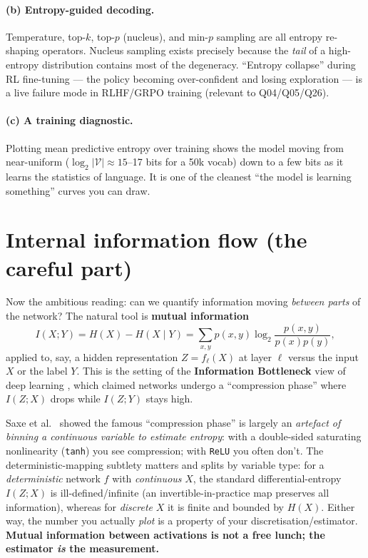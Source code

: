 \documentclass[11pt,letterpaper]{article}
\begin{document}
\paragraph{(b) Entropy-guided decoding.}
Temperature, top-$k$, top-$p$ (nucleus), and min-$p$ sampling are all entropy
re-shaping operators. Nucleus sampling \citep{holtzman2020nucleus} exists precisely
because the \emph{tail} of a high-entropy distribution contains most of the
degeneracy. ``Entropy collapse'' during RL fine-tuning --- the policy becoming
over-confident and losing exploration --- is a live failure mode in RLHF/GRPO
training (relevant to Q04/Q05/Q26).

\paragraph{(c) A training diagnostic.}
Plotting mean predictive entropy over training shows the model moving from
near-uniform ($\log_2|\mathcal V|\approx 15$--17 bits for a 50k vocab) down to a
few bits as it learns the statistics of language. It is one of the cleanest
``the model is learning something'' curves you can draw.

\section{Internal information flow (the careful part)}

Now the ambitious reading: can we quantify information moving \emph{between parts}
of the network? The natural tool is \textbf{mutual information}
\[
  I(X;Y) = H(X) - H(X\mid Y) = \sum_{x,y} p(x,y)\log_2\frac{p(x,y)}{p(x)p(y)},
\]
applied to, say, a hidden representation $Z=f_\ell(X)$ at layer $\ell$ versus the
input $X$ or the label $Y$. This is the setting of the \textbf{Information
Bottleneck} view of deep learning \citep{tishby2015ib,shwartzziv2017opening},
which claimed networks undergo a ``compression phase'' where $I(Z;X)$ drops
while $I(Z;Y)$ stays high.

\begin{keybox}
Saxe et al.\ \citeyearpar{saxe2018ib} showed the famous ``compression phase'' is
largely an \emph{artefact of binning a continuous variable to estimate entropy}:
with a double-sided saturating nonlinearity (\texttt{tanh}) you see compression;
with \texttt{ReLU} you often don't. The deterministic-mapping subtlety matters and
splits by variable type: for a \emph{deterministic} network $f$ with
\emph{continuous} $X$, the standard differential-entropy $I(Z;X)$ is
ill-defined/infinite (an invertible-in-practice map preserves all information),
whereas for \emph{discrete} $X$ it is finite and bounded by $H(X)$. Either way,
the number you actually \emph{plot} is a property of your discretisation/estimator.
\textbf{Mutual information between activations is not a free lunch; the estimator
\emph{is} the measurement.}
\end{keybox}
\end{document}
